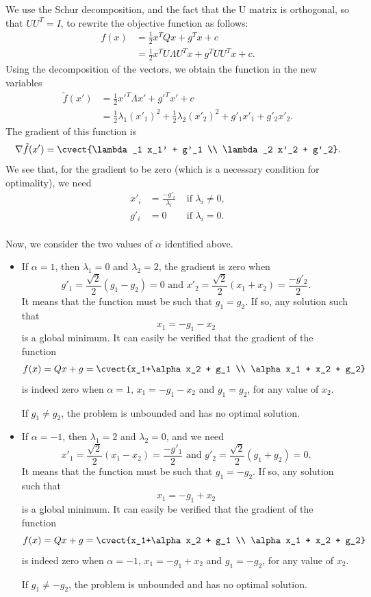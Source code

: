 We use the Schur decomposition, and the fact that the U matrix is
orthogonal, so that $UU^T=I$, to rewrite the objective function as follows:
\begin{align*}
  f(x) &= \frac{1}{2} x^T Q x + g^T x + c \\
  &= \frac{1}{2} x^T U \Lambda U^Tx + g^TUU^Tx + c.
\end{align*}
Using the decomposition of the vectors, we obtain the function in the
new variables
\begin{align*}
  \tilde{f}(x') &= \frac{1}{2} {x'}^T \Lambda x' + {g'}^Tx' + c \\
        &=\frac{1}{2} \lambda_1(x'_1)^2 + \frac{1}{2}
  \lambda_2(x'_2)^2 + g'_1 x'_1 + g'_2 x'_2.
\end{align*}
The gradient of this function is
\[
\nabla \tilde{f}(x') = \cvect{\lambda_1 x_1' + g'_1 \\ \lambda_2 x'_2 + g'_2}.
\]
We see that, for the gradient to be zero (which is a necessary
condition for optimality), we need
\begin{align*}
  x'_i &= \frac{-g'_i}{\lambda_i} & \text{ if } \lambda_i \neq 0, \\
  g'_i &= 0 & \text{ if } \lambda_i = 0. \\
\end{align*}

Now, we consider the two values of $\alpha$
identified above.

\begin{itemize}
\item If $\alpha=1$, then $\lambda_1=0$ and $\lambda_2 = 2$, the
  gradient is zero when
  \[
g'_1 = \frac{\sqrt{2}}{2}(g_1-g_2) = 0 \text{ and } x'_2 = \frac{\sqrt{2}}{2}(x_1+x_2)=\frac{-g'_2}{2}.
  \]
It means that the function must be such that $g_1=g_2$. If so, any
solution such that
\[
x_1 = -g_1 - x_2
\]
is a global minimum. It can easily be verified that the gradient of the function
\[
f(x) = Qx+g = \cvect{x_1+\alpha x_2 + g_1 \\ \alpha x_1 + x_2 + g_2}
\]
is indeed zero when $\alpha=1$, $x_1 = -g_1 - x_2$ and $g_1=g_2$, for
any value of $x_2$.

If $g_1 \neq g_2$, the problem is unbounded and
has no optimal solution.

\item If $\alpha=-1$, then $\lambda_1=2$ and $\lambda_2 = 0$, and we need
  \[
 x'_1 = \frac{\sqrt{2}}{2}(x_1-x_2)=\frac{-g'_1}{2}\text{ and } g'_2 = \frac{\sqrt{2}}{2}(g_1+g_2) = 0.
  \]
It means that the function must be such that $g_1=-g_2$. If so, any
solution such that
\[
x_1 = -g_1+x_2
\]
is a global minimum.
It can easily be verified that the gradient of the function
\[
f(x) = Qx+g = \cvect{x_1+\alpha x_2 + g_1 \\ \alpha x_1 + x_2 + g_2}
\]
is indeed zero when $\alpha=-1$, $x_1 = -g_1 + x_2$ and $g_1=-g_2$, for
any value of $x_2$.

If $g_1\neq-g_2$, the problem is unbounded and has no
optimal solution. 
\end{itemize}

